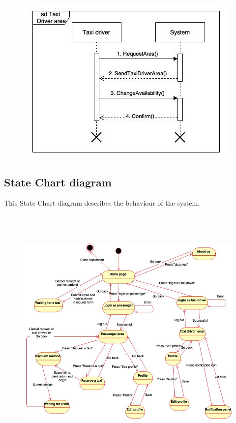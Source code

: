 \documentclass[18pt,oneside,a4paper, titlepage]{article}
\begin{document}
\begin{itemize}
				\begin{figure}[h]
					\centering
					\includegraphics[scale=1]{SequenceTaxiArea.jpg}
				\end{figure}
	\end{itemize}
\newpage
	\subsection{State Chart diagram}
		This State Chart diagram describes the behaviour of the system.
		\\ \\ \\ \\ 
		\begin{figure}[h]
			\centering
			\includegraphics[scale=0.5]{stateChartDiagram.jpg}
		\end{figure}
\end{document}
